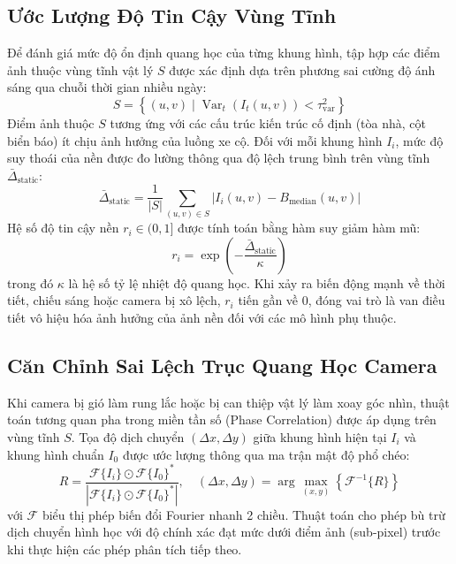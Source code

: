 \documentclass[11pt,a4paper]{article}
\begin{document}
\subsection{Ước Lượng Độ Tin Cậy Vùng Tĩnh}
Để đánh giá mức độ ổn định quang học của từng khung hình, tập hợp các điểm ảnh thuộc vùng tĩnh vật lý $S$ được xác định dựa trên phương sai cường độ ánh sáng qua chuỗi thời gian nhiều ngày:
\begin{equation}
    S = \left\{(u, v) \mid \operatorname{Var}_{t}(I_t(u, v)) < \tau_{\text{var}}^2 \right\}
\end{equation}
Điểm ảnh thuộc $S$ tương ứng với các cấu trúc kiến trúc cố định (tòa nhà, cột biển báo) ít chịu ảnh hưởng của luồng xe cộ. Đối với mỗi khung hình $I_i$, mức độ suy thoái của nền được đo lường thông qua độ lệch trung bình trên vùng tĩnh $\bar{\Delta}_{\text{static}}$:
\begin{equation}
    \bar{\Delta}_{\text{static}} = \frac{1}{|S|} \sum_{(u, v) \in S} |I_i(u, v) - B_{\text{median}}(u, v)|
\end{equation}
Hệ số độ tin cậy nền $r_i \in (0, 1]$ được tính toán bằng hàm suy giảm hàm mũ:
\begin{equation}
    r_i = \exp\left( -\frac{\bar{\Delta}_{\text{static}}}{\kappa} \right)
\end{equation}
trong đó $\kappa$ là hệ số tỷ lệ nhiệt độ quang học. Khi xảy ra biến động mạnh về thời tiết, chiếu sáng hoặc camera bị xô lệch, $r_i$ tiến gần về 0, đóng vai trò là van điều tiết vô hiệu hóa ảnh hưởng của ảnh nền đối với các mô hình phụ thuộc.

\subsection{Căn Chỉnh Sai Lệch Trục Quang Học Camera}
Khi camera bị gió làm rung lắc hoặc bị can thiệp vật lý làm xoay góc nhìn, thuật toán tương quan pha trong miền tần số (Phase Correlation) được áp dụng trên vùng tĩnh $S$. Tọa độ dịch chuyển $(\Delta x, \Delta y)$ giữa khung hình hiện tại $I_i$ và khung hình chuẩn $I_0$ được ước lượng thông qua ma trận mật độ phổ chéo:
\begin{equation}
    R = \frac{\mathcal{F}\{I_i\} \odot \mathcal{F}\{I_0\}^*}{\left| \mathcal{F}\{I_i\} \odot \mathcal{F}\{I_0\}^* \right|}, \quad (\Delta x, \Delta y) = \arg\max_{(x, y)} \left\{ \mathcal{F}^{-1}\{R\} \right\}
\end{equation}
với $\mathcal{F}$ biểu thị phép biến đổi Fourier nhanh 2 chiều. Thuật toán cho phép bù trừ dịch chuyển hình học với độ chính xác đạt mức dưới điểm ảnh (sub-pixel) trước khi thực hiện các phép phân tích tiếp theo.
\end{document}
